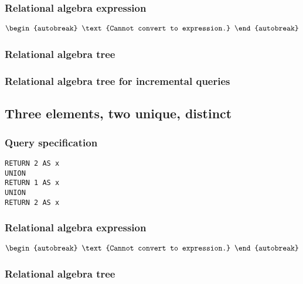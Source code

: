\subsubsection*{Relational algebra expression}

\begin{align*}
\begin{autobreak}
\text{Cannot convert to expression.}
\end{autobreak}
\end{align*}

\subsubsection*{Relational algebra tree}


\subsubsection*{Relational algebra tree for incremental queries}


\subsection{Three elements, two unique, distinct}

\subsubsection*{Query specification}

\begin{lstlisting}
RETURN 2 AS x
UNION
RETURN 1 AS x
UNION
RETURN 2 AS x
\end{lstlisting}

\subsubsection*{Relational algebra expression}

\begin{align*}
\begin{autobreak}
\text{Cannot convert to expression.}
\end{autobreak}
\end{align*}

\subsubsection*{Relational algebra tree}

